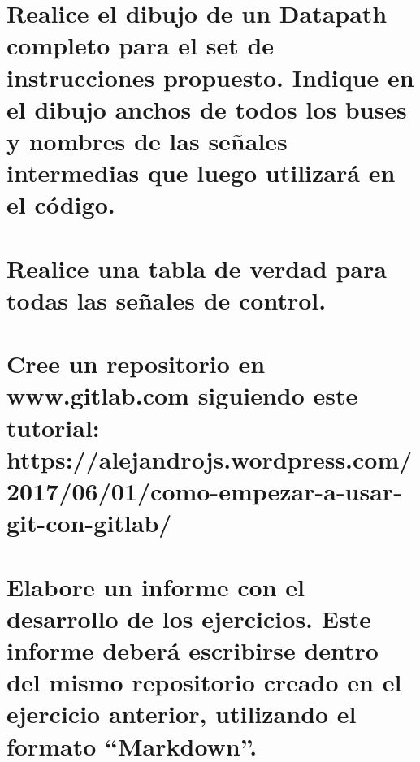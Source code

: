 \documentclass[11pt,a4paper]{article}
\begin{document}
\section{Realice el dibujo de un Datapath completo para el set de instrucciones propuesto.
Indique en el dibujo anchos de todos los buses y nombres de las señales
intermedias que luego utilizará en el código.}

\section{Realice una tabla de verdad para todas las señales de control.}

\section{Cree un repositorio en www.gitlab.com siguiendo este tutorial:
\small https://alejandrojs.wordpress.com/2017/06/01/como-empezar-a-usar-git-con-gitlab/}

\section{Elabore un informe con el desarrollo de los ejercicios. Este informe deberá
escribirse dentro del mismo repositorio creado en el ejercicio anterior, utilizando el
formato “Markdown”.}
\end{document}

